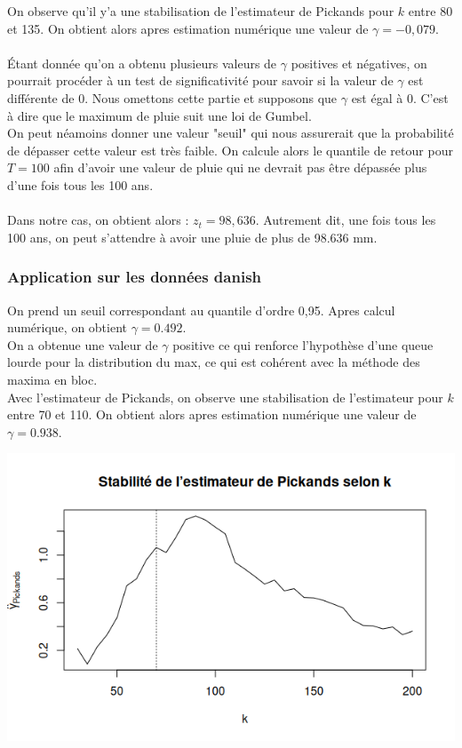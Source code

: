 \documentclass{article}
\theoremstyle{plain}
\theoremstyle{definition}
\theoremstyle{plain}
\begin{document}
On observe qu'il y'a une stabilisation de l'estimateur de Pickands pour $k$ entre 80 et 135. On obtient alors apres estimation numérique une valeur de $\gamma = -0,079$.
\\
\\
Étant donnée qu'on a obtenu plusieurs valeurs de $\gamma$ positives et négatives, on pourrait procéder à un test de significativité pour savoir si la valeur de $\gamma$ est différente de 0. Nous omettons cette partie et supposons que $\gamma$ est égal à 0. C'est à dire que le maximum de pluie suit une loi de Gumbel.
\\
On peut néamoins donner une valeur "seuil" qui nous assurerait que la probabilité de dépasser cette valeur est très faible. 
On calcule alors le quantile de retour pour $T=100$ afin d'avoir une valeur de pluie qui ne devrait pas être dépassée plus d'une fois tous les 100 ans.
\\
\\
Dans notre cas, on obtient alors : $z_t = 98,636$. Autrement dit, une fois tous les 100 ans, on peut s'attendre à avoir une pluie de plus de 98.636 mm.

\subsubsection{Application sur les données danish}

On prend un seuil correspondant au quantile d’ordre 0,95. Apres calcul numérique, on obtient $\gamma = 0.492$.
\\
On a obtenue une valeur de $\gamma$ positive ce qui renforce l'hypothèse d'une queue lourde pour la distribution du max, ce qui est cohérent avec la méthode des maxima en bloc. 
\\
Avec l'estimateur de Pickands, on observe une stabilisation de l'estimateur pour $k$ entre 70 et 110. On obtient alors apres estimation numérique une valeur de $\gamma = 0.938$.

\begin{center}
	\includegraphics[scale=0.65]{./images/pickandsdansih.png} 
\end{center}
\end{document}
